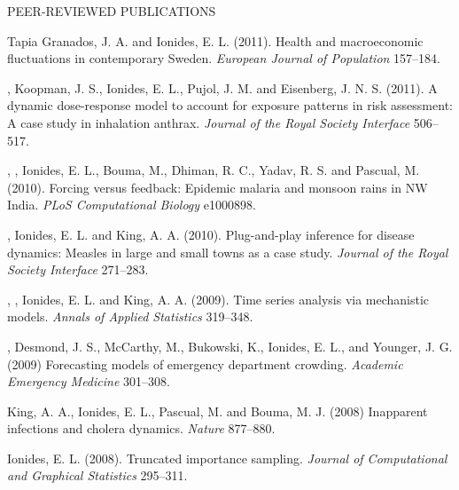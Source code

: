 \begin{reflist}{PEER-REVIEWED PUBLICATIONS}
\item\formal{[[\tapiaEJP] ]} Tapia Granados, J. A. and Ionides, E. L. (2011). Health and macroeconomic fluctuations in contemporary Sweden. {\em European Journal of Population} {}{\separator}157--184.



\item\formal{[[\mayerJRSI] ]} , Koopman, J. S., Ionides, E. L., Pujol, J. M. and  Eisenberg, J. N. S. (2011). A dynamic dose-response model to account for exposure patterns in risk assessment: A case study in inhalation anthrax. {\em Journal of the Royal Society Interface} {}{\separator}506--517.


\item\formal{[[\laneriPLOSCB] ]} , , Ionides, E. L., Bouma, M., Dhiman, R. C., Yadav, R. S. and Pascual, M. (2010).  Forcing versus feedback: Epidemic malaria and monsoon rains in NW India. {\em PLoS Computational Biology} {}{\separator}e1000898.

\item\formal{[[\heJRSI] ]}
, Ionides, E. L. and King, A. A. (2010).
Plug-and-play inference for disease dynamics: Measles in large and small towns as a case study. {\em Journal of the Royal Society Interface} {}{\separator}271--283.


\item\formal{[[\bretoAOAS] ]}
 ,  , Ionides, E. L. and King, A. A. (2009).
Time series analysis via mechanistic models. 
{\em Annals of Applied Statistics} {}{\separator}319--348.

\item\formal{[[\schweiglerAEM] ]}
, Desmond, J. S., McCarthy, M., Bukowski, K., Ionides, E. L., and Younger, J. G. (2009) Forecasting models of emergency department crowding. {\em Academic Emergency Medicine} {}{\separator}301--308.

\item\formal{[[\kingNATURE] ]}
King, A. A., Ionides, E. L., Pascual, M. and Bouma, M. J. (2008) Inapparent infections and cholera dynamics. {\em Nature} {}{\separator}877--880.

\item\formal{[[\ionidesJCGS] ]}
Ionides, E. L. (2008). Truncated importance sampling. {\em Journal of Computational and Graphical Statistics} {}{\separator}295--311.


\end{reflist}
